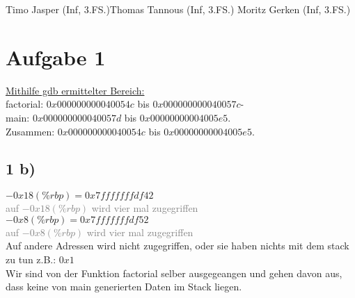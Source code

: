 \documentclass{ti2}
\begin{document}
\lstset{linewidth=\linewidth,breaklines=true}
%
                {Timo Jasper (Inf, 3.FS.)}{Thomas Tannous (Inf, 3.FS.)}%
                {Moritz Gerken (Inf, 3.FS.)}%

\section*{Aufgabe 1}
\underline{Mithilfe gdb ermittelter Bereich:} \\
factorial: $0x000000000040054c$ bis $0x000000000040057c$-\\
main: $0x000000000040057d$ bis $0x00000000004005e5$.\\
Zusammen: $0x000000000040054c$ bis $0x00000000004005e5$. \\
\subsection*{1 b)}

$-0x18(\%rbp) = 0x7fffffffdf42$\\
\textcolor{gray}{auf $-0x18(\%rbp)$ wird vier mal zugegriffen}\\
$-0x8(\%rbp) = 0x7fffffffdf52$\\
\textcolor{gray}{auf $-0x8(\%rbp)$ wird vier mal zugegriffen}\\

Auf andere Adressen wird nicht zugegriffen, oder sie haben nichts mit dem stack zu tun z.B.: $0x1$\\
Wir sind von der Funktion factorial selber ausgegeangen und gehen davon aus, dass keine von main generierten Daten im Stack liegen.\\
\end{document}
